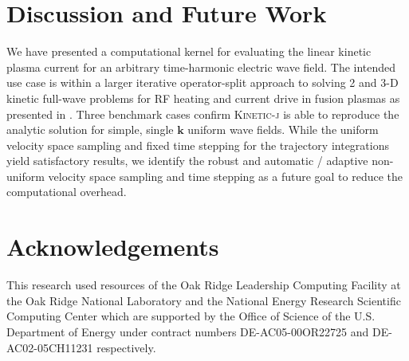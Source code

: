 \documentclass[final,5p,times,twocolumn]{elsarticle}
\renewcommand{\vec}[1]{\mathbf{#1}}
\newcommand{\kj}{\textsc{Kinetic-j}\xspace}
\begin{document}
\section{Discussion and Future Work}
\label{section:discussion}
%
We have presented a computational kernel for evaluating the linear kinetic plasma current for an arbitrary time-harmonic electric wave field. The intended use case is within a larger iterative operator-split approach to solving 2 and 3-D kinetic full-wave problems for RF heating and current drive in fusion plasmas as presented in \cite{green2014}. Three benchmark cases confirm \kj is able to reproduce the analytic solution for simple, single $\vec{k}$ uniform wave fields. While the uniform velocity space sampling and fixed time stepping for the trajectory integrations yield satisfactory results, we identify the robust and automatic / adaptive non-uniform velocity space sampling and time stepping as a future goal to reduce the computational overhead. 
%
\section{Acknowledgements}
\label{section:acknowledgements}
This research used resources of the Oak Ridge Leadership Computing Facility at the Oak Ridge National Laboratory and the National Energy Research Scientific Computing Center which are supported by the Office of Science of the U.S. Department of Energy under contract numbers DE-AC05-00OR22725 and DE-AC02-05CH11231 respectively.













\end{document}
